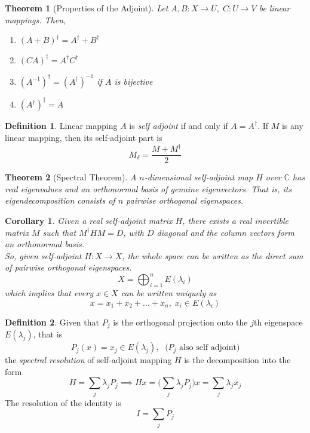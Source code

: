 \documentclass{article}
\newtheorem{theorem}{Theorem}[section]
\newtheorem{corollary}{Corollary}[theorem]
\theoremstyle{remark}
\theoremstyle{definition}
\newtheorem{definition}{Definition}[section]
\begin{document}
\begin{theorem}[Properties of the Adjoint] Let $A, B: X \longrightarrow U, \; C: U \longrightarrow V$ be linear mappings. Then, 
\begin{enumerate}
    \item $(A + B)^\dagger = A^\dagger + B^\dagger$
    \item $(C A)^\dagger = A^\dagger C^\dagger$
    \item $(A^{-1})^\dagger = (A^\dagger)^{-1}$ if $A$ is bijective
    \item $(A^\dagger)^\dagger = A$
\end{enumerate}
\end{theorem}

\begin{definition}
Linear mapping $A$ is \textit{self adjoint} if and only if $A = A^\dagger$. If $M$ is any linear mapping, then its self-adjoint part is 
\[M_\delta = \frac{M + M^\dagger}{2}\]
\end{definition}

\begin{theorem}[Spectral Theorem]
A $n$-dimensional self-adjoint map $H$ over $\mathbb{C}$ has real eigenvalues and an orthonormal basis of genuine eigenvectors. That is, its eigendecomposition consists of $n$ pairwise orthogonal eigenspaces. 
\end{theorem}

\begin{corollary}
Given a real self-adjoint matrix $H$, there exists a real invertible matrix $M$ such that $M^\dagger H M = D$, with $D$ diagonal and the column vectors form an orthonormal basis.
\\

So, given self-adjoint $H: X \longrightarrow X$, the whole space can be written as the direct sum of pairwise orthogonal eigenspaces. 
\[X = \bigoplus_{i=1}^n E(\lambda_i)\]
which implies that every $x \in X$ can be written uniquely as 
\[x = x_1 + x_2 + ... + x_n, \; x_i \in E(\lambda_i) \]
\end{corollary}

\begin{definition}
Given that $P_j$ is the orthogonal projection onto the $j$th eigenspace $E(\lambda_j)$, that is
\[P_j (x) = x_j \in E(\lambda_j), \; \text{ ($P_j$ also self adjoint)}\]
the \textit{spectral resolution} of self-adjoint mapping $H$ is the decomposition into the form 
\[H = \sum_j \lambda_j P_j \implies H x = \bigg( \sum_j \lambda_j P_j \bigg) x = \sum_j \lambda_j x_j\]
The resolution of the identity is
\[I = \sum_j P_j\]
\end{definition}
\end{document}
